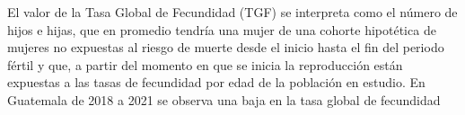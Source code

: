 El valor de la Tasa Global de Fecundidad (TGF) se interpreta como el número de hijos e hijas, que en promedio tendría una mujer de una cohorte hipotética de mujeres no expuestas al riesgo de muerte desde el inicio hasta el fin del periodo fértil y que, a partir del momento en que se inicia la reproducción están expuestas a las tasas de fecundidad por edad de la población en estudio. En Guatemala de 2018 a 2021 se observa una baja en la tasa global de fecundidad